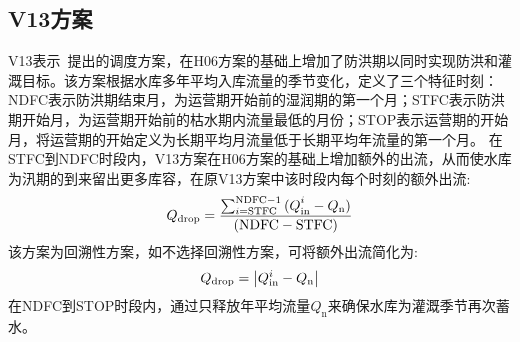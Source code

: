 \subsection{V13方案}
V13表示~\citet{voisin2013improved}提出的调度方案，在H06方案的基础上增加了防洪期以同时实现防洪和灌溉目标。该方案根据水库多年平均入库流量的季节变化，定义了三个特征时刻：NDFC表示防洪期结束月，为运营期开始前的湿润期的第一个月；STFC表示防洪期开始月，为运营期开始前的枯水期内流量最低的月份；STOP表示运营期的开始月，\citet{hanasaki2006reservoir}将运营期的开始定义为长期平均月流量低于长期平均年流量的第一个月。
在STFC到NDFC时段内，V13方案在H06方案的基础上增加额外的出流，从而使水库为汛期的到来留出更多库容，在原V13方案中该时段内每个时刻的额外出流:
\begin{equation}
  Q_{\rm drop} = \frac{\sum_{i = \text{STFC}}^{\text{NDFC} - 1}{{(Q}_{\text{in}}^{i} - Q_{\mathrm{n}})}}{\left( \text{NDFC} - \text{STFC} \right)}
\end{equation}
该方案为回溯性方案，如不选择回溯性方案，可将额外出流简化为:
\begin{equation}
  Q_{\rm drop} = \left| Q_{\text{in}}^{i} - Q_{\mathrm{n}} \right|
\end{equation}
在NDFC到STOP时段内，通过只释放年平均流量$Q_{\mathrm{n}}$来确保水库为灌溉季节再次蓄水。

